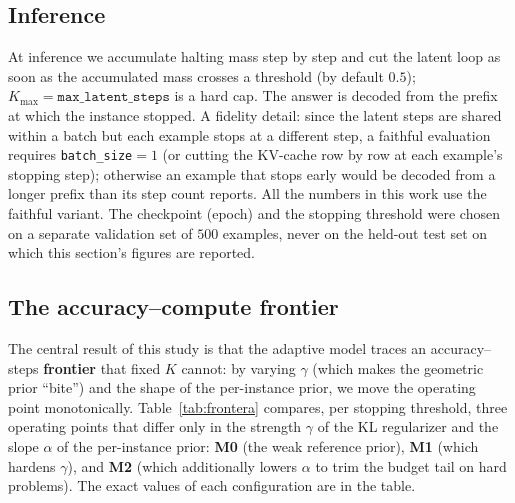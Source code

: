\documentclass[11pt]{article}
\begin{document}
\subsection{Inference}
\label{sec:inferencia}

At inference we accumulate halting mass step by step and cut the latent loop as soon as the accumulated mass crosses a threshold (by default $0.5$); $K_{\max} = \texttt{max\_latent\_steps}$ is a hard cap. The answer is decoded from the prefix at which the instance stopped. A fidelity detail: since the latent steps are shared within a batch but each example stops at a different step, a faithful evaluation requires \texttt{batch\_size}$=1$ (or cutting the KV-cache row by row at each example's stopping step); otherwise an example that stops early would be decoded from a longer prefix than its step count reports. All the numbers in this work use the faithful variant. The checkpoint (epoch) and the stopping threshold were chosen on a separate validation set of $500$ examples, never on the held-out test set on which this section's figures are reported.

\subsection{The accuracy--compute frontier}
\label{sec:frontera}

The central result of this study is that the adaptive model traces an accuracy--steps \textbf{frontier} that fixed $K$ cannot: by varying $\gamma$ (which makes the geometric prior ``bite'') and the shape of the per-instance prior, we move the operating point monotonically. Table~\ref{tab:frontera} compares, per stopping threshold, three operating points that differ only in the strength $\gamma$ of the KL regularizer and the slope $\alpha$ of the per-instance prior: \textbf{M0} (the weak reference prior), \textbf{M1} (which hardens $\gamma$), and \textbf{M2} (which additionally lowers $\alpha$ to trim the budget tail on hard problems). The exact values of each configuration are in the table.
\end{document}
